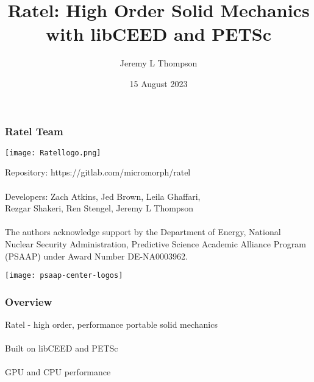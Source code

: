 \documentclass{beamer}
\title[Ratel]{Ratel: High Order Solid Mechanics with libCEED and PETSc} %
\author{Jeremy L Thompson} %
\institute[CU Boulder] %
{University of Colorado Boulder \\ %
\medskip
\textit{jeremy@jeremylt.org} %
}
\date{15 August 2023} %
\begin{document}
\begin{frame}
\titlepage %
\end{frame}
 

\begin{frame}
\frametitle{Ratel Team}

\begin{center}
\texttt{[image: Ratellogo.png]}
\end{center}

{\flushleft

Repository: https://gitlab.com/micromorph/ratel\\

~\\

Developers: Zach Atkins, Jed Brown, Leila Ghaffari,\\
\hspace{19mm} Rezgar Shakeri, Ren Stengel, Jeremy L Thompson\\

~\\

The authors acknowledge support by the Department of Energy, National Nuclear Security Administration, Predictive Science Academic Alliance Program (PSAAP) under Award Number DE-NA0003962.

}

\begin{center}
\texttt{[image: psaap-center-logos]}
\end{center}

\end{frame}


\begin{frame}
\begin{center}
\frametitle{Overview}

Ratel - high order, performance portable solid mechanics\\

~\\

Built on libCEED and PETSc\\

~\\

GPU and CPU performance\\

~\\

\end{center}
\end{frame}
 
\end{document}
